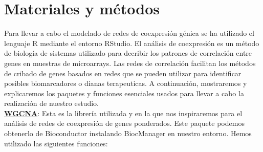 	

	\newpage

	\section{Materiales y métodos}
	
	\noindent Para llevar a cabo el modelado de redes de coexpresión génica se ha utilizado el lenguaje R mediante el entorno RStudio. El análisis de coexpresión es un método de biología de sistemas utilizado para decribir los patrones de correlación entre genes en muestras de microarrays. Las redes de correlación facilitan los métodos de cribado de genes basados en redes que se pueden utilizar para identificar posibles biomarcadores o dianas terapeuticas. A continuación, mostraremos y explicaremos los paquetes y funciones esenciales usados para llevar a cabo la realización de nuestro estudio. \\
	
	\noindent \underline{\bfseries{WGCNA}}: Esta es la librería utilizada y en la que nos inspiraremos para el análisis de redes de coexpresión de genes ponderados. Este paquete podemos obtenerlo de Bioconductor instalando BiocManager en nuestro entorno. Hemos utilizado las siguientes funciones: \\
	
